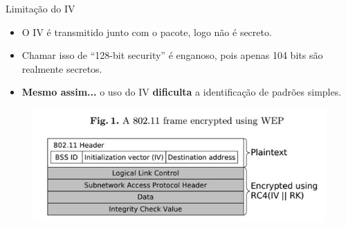 \begin{frame}{Limitação do IV}
    \begin{itemize}
        \item O IV é transmitido junto com o pacote, logo não é secreto.
        \item Chamar isso de “128-bit security” é enganoso, pois apenas 104 bits são realmente secretos.
        \item \textbf{Mesmo assim...} o uso do IV \textbf{dificulta} a identificação de padrões simples.
    \end{itemize}

    \begin{figure}
        \centering
        \includegraphics[width=0.9\linewidth]{Figuras/frame-encrypted-using-wep.png}

    \end{figure}

\end{frame}

